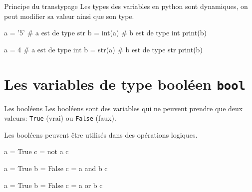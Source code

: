 \begin{easybox}{Principe du transtypage}{}
    Les types des variables en python sont dynamiques, on peut modifier sa valeur ainsi que son type.
    
    \begin{minipage}[t]{0.48\linewidth}
        \begin{ConsolePythontex}[ Label=false]{}
            a = '5'     # a est de type str
            b = int(a)  # b est de type int
            print(b)
        \end{ConsolePythontex}
    \end{minipage}\hfill
    \begin{minipage}[t]{0.48\linewidth}
        \begin{ConsolePythontex}[ Label=false]{}
            a = 4       # a est de type int
            b = str(a)  # b est de type str
            print(b)
        \end{ConsolePythontex}
    \end{minipage}
    
    \end{easybox}

    \section{Les variables de type booléen \texttt{bool}}

    
\begin{easybox}{Les booléens}{}
    \smallskip
    Les booléens sont des variables qui ne peuvent prendre que deux valeurs: \verb+True+ (vrai) ou \verb+False+ (faux).
    
    \smallskip
    Les booléens peuvent être utilisés dans des opérations logiques.
    
	\medskip

    \begin{minipage}{0.32\linewidth}
         \begin{ConsolePythontex}[ Label=false]{}
a = True
c = not a
c
        \end{ConsolePythontex}
        
    \end{minipage}\hfill
    \begin{minipage}{0.32\linewidth}
        \begin{ConsolePythontex}[ Label=false]{}
a = True
b = False
c = a and b
c
        \end{ConsolePythontex}
    \end{minipage}\hfill
    \begin{minipage}{0.32\linewidth}
       
        \begin{ConsolePythontex}[ Label=false]{}
a = True
b = False
c = a or b
c
        \end{ConsolePythontex}
    \end{minipage}    
\end{easybox}

